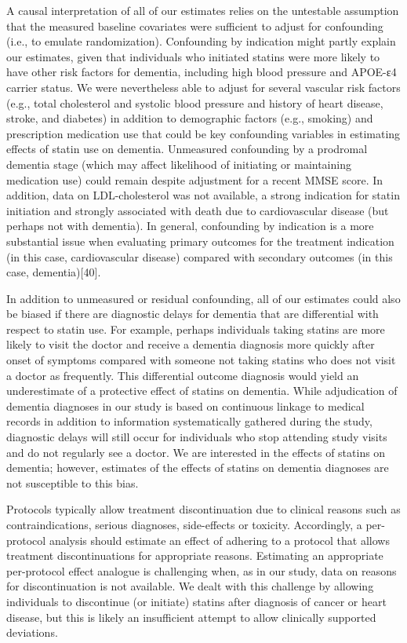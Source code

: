 \documentclass[
]{book}
\begin{document}
A causal interpretation of all of our estimates relies on the untestable assumption that the measured baseline covariates were sufficient to adjust for confounding (i.e., to emulate randomization). Confounding by indication might partly explain our estimates, given that individuals who initiated statins were more likely to have other risk factors for dementia, including high blood pressure and APOE-ε4 carrier status. We were nevertheless able to adjust for several vascular risk factors (e.g., total cholesterol and systolic blood pressure and history of heart disease, stroke, and diabetes) in addition to demographic factors (e.g., smoking) and prescription medication use that could be key confounding variables in estimating effects of statin use on dementia. Unmeasured confounding by a prodromal dementia stage (which may affect likelihood of initiating or maintaining medication use) could remain despite adjustment for a recent MMSE score. In addition, data on LDL-cholesterol was not available, a strong indication for statin initiation and strongly associated with death due to cardiovascular disease (but perhaps not with dementia). In general, confounding by indication is a more substantial issue when evaluating primary outcomes for the treatment indication (in this case, cardiovascular disease) compared with secondary outcomes (in this case, dementia){[}40{]}.

In addition to unmeasured or residual confounding, all of our estimates could also be biased if there are diagnostic delays for dementia that are differential with respect to statin use. For example, perhaps individuals taking statins are more likely to visit the doctor and receive a dementia diagnosis more quickly after onset of symptoms compared with someone not taking statins who does not visit a doctor as frequently. This differential outcome diagnosis would yield an underestimate of a protective effect of statins on dementia. While adjudication of dementia diagnoses in our study is based on continuous linkage to medical records in addition to information systematically gathered during the study, diagnostic delays will still occur for individuals who stop attending study visits and do not regularly see a doctor. We are interested in the effects of statins on dementia; however, estimates of the effects of statins on dementia diagnoses are not susceptible to this bias.

Protocols typically allow treatment discontinuation due to clinical reasons such as contraindications, serious diagnoses, side-effects or toxicity. Accordingly, a per-protocol analysis should estimate an effect of adhering to a protocol that allows treatment discontinuations for appropriate reasons. Estimating an appropriate per-protocol effect analogue is challenging when, as in our study, data on reasons for discontinuation is not available. We dealt with this challenge by allowing individuals to discontinue (or initiate) statins after diagnosis of cancer or heart disease, but this is likely an insufficient attempt to allow clinically supported deviations.
\end{document}
